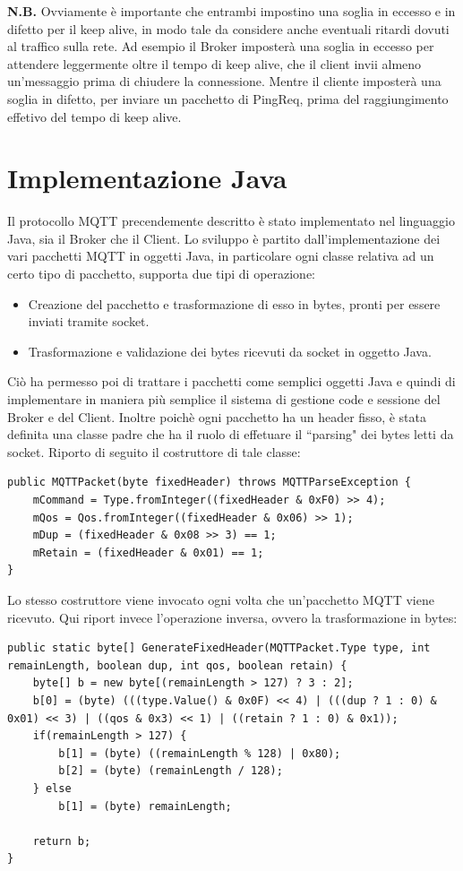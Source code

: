 \documentclass{article}
\begin{document}
\textbf{N.B.} Ovviamente è importante che entrambi impostino una soglia in eccesso e in difetto per il keep alive, in modo tale da considere anche eventuali ritardi dovuti al traffico sulla rete. Ad esempio il Broker imposterà una soglia in eccesso per attendere leggermente oltre il tempo di keep alive, che il client invii almeno un'messaggio prima di chiudere la connessione. Mentre il cliente imposterà una soglia in difetto, per inviare un pacchetto di PingReq, prima del raggiungimento effetivo del tempo di keep alive.


\section{Implementazione Java}
Il protocollo MQTT precendemente descritto è stato implementato nel linguaggio Java, sia il Broker che il Client. Lo sviluppo è partito dall'implementazione dei vari pacchetti MQTT in oggetti Java, in particolare ogni classe relativa ad un certo tipo di pacchetto, supporta due tipi di operazione:
\begin{itemize}
	\item Creazione del pacchetto e trasformazione di esso in bytes, pronti per essere inviati tramite socket.
	\item Trasformazione e validazione dei bytes ricevuti da socket in oggetto Java.
\end{itemize}
Ciò ha permesso poi di trattare i pacchetti come semplici oggetti Java e quindi di implementare in maniera più semplice il sistema di gestione code e sessione del Broker e del Client. Inoltre poichè ogni pacchetto ha un header fisso, è stata definita una classe padre che ha il ruolo di effetuare il ``parsing" dei bytes letti da socket. Riporto di seguito il costruttore di tale classe:
\begin{lstlisting}
public MQTTPacket(byte fixedHeader) throws MQTTParseException {
	mCommand = Type.fromInteger((fixedHeader & 0xF0) >> 4);
	mQos = Qos.fromInteger((fixedHeader & 0x06) >> 1);
	mDup = (fixedHeader & 0x08 >> 3) == 1;
	mRetain = (fixedHeader & 0x01) == 1;
}
\end{lstlisting}
Lo stesso costruttore viene invocato ogni volta che un'pacchetto MQTT viene ricevuto. Qui riport invece l'operazione inversa, ovvero la trasformazione in bytes:
\begin{lstlisting}
public static byte[] GenerateFixedHeader(MQTTPacket.Type type, int remainLength, boolean dup, int qos, boolean retain) {
	byte[] b = new byte[(remainLength > 127) ? 3 : 2];
	b[0] = (byte) (((type.Value() & 0x0F) << 4) | (((dup ? 1 : 0) & 0x01) << 3) | ((qos & 0x3) << 1) | ((retain ? 1 : 0) & 0x1));
	if(remainLength > 127) {
		b[1] = (byte) ((remainLength % 128) | 0x80);
		b[2] = (byte) (remainLength / 128);
	} else
		b[1] = (byte) remainLength;
	
	return b;
}
\end{lstlisting}
\end{document}
